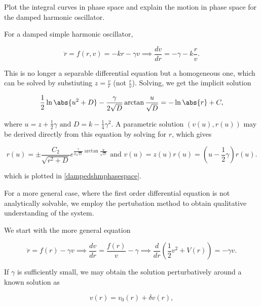 \documentclass[english,a4paper,12pt]{report}
\begin{document}
{Plot the integral curves in phase space and explain the motion in phase space for the damped harmonic oscillator.}
{For a damped simple harmonic oscillator,

\begin{equation}
    \ddot{r} = f(r,v) = -kr- \gamma v \implies \frac{dv}{dr} = -\gamma - k \frac{r}{v}.  
\end{equation}

This is no longer a separable differential equation but a homogeneous one, which can be solved by substiuting \(z = \frac{v}{r} \) (not \(\frac{r}{v} \)). Solving, we get the implicit solution 

\begin{equation}
    \frac{1}{2}\ln \abs{u^2+D} - \frac{\gamma }{2\sqrt{D} }\arctan {\frac{u}{\sqrt{D} } } = -\ln \abs{r} + C,    
\end{equation}

where \(u = z + \frac{1}{2} \gamma \text { and } D = k - \frac{1}{4}\gamma ^2  \). A parametric solution \((v(u), r(u))\) may be derived directly from this equation by solving for \(r\), which gives

\begin{equation}
    r(u) = \pm \frac{C_2 }{\sqrt{r^2+D} } e^{\frac{\gamma }{2\sqrt{D} } \arctan {\frac{u}{\sqrt{D} } } } \text { and } v(u) = z(u)r(u) = (u - \frac{1}{2}\gamma  ) r(u).  
\end{equation}

which is plotted in \cref{dampedshmphasespace}. 
} 

For a more general case, where the first order differential equation is not analytically solvable, we employ the pertubation method to obtain qualitative understanding of the system. 

We start with the more general equation 

\begin{equation}
    \ddot{r} = f(r) -\gamma v \implies \frac{dv}{dr} = \frac{f(r)}{v} - \gamma \implies \frac{d}{dr} (\frac{1}{2} v^2 + V(r) ) = -\gamma v. 
\end{equation}

If \(\gamma \) is sufficiently small, we may obtain the solution perturbatively around a known solution as

\begin{equation}
    v(r) = v_0 (r) + \delta v(r), 
\end{equation}
\end{document}
